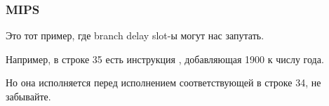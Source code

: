 \subsubsection{MIPS}



Это тот пример, где branch delay slot-ы могут нас запутать.

Например, в строке 35 есть инструкция , добавляющая 1900 к числу года.

Но она исполняется перед исполнением соответствующей  в строке 34, не забывайте.

